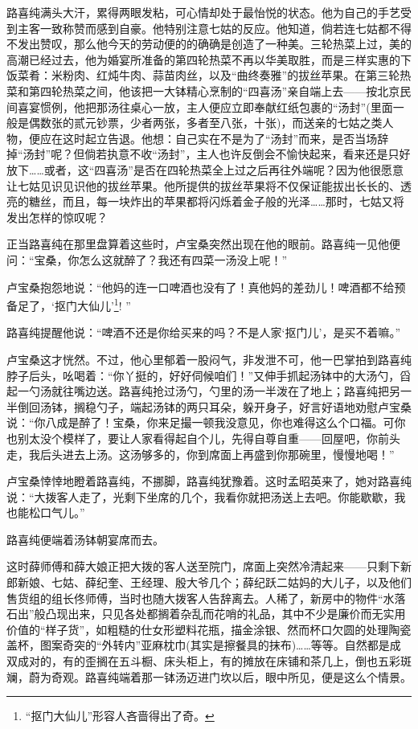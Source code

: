 \par 路喜纯满头大汗，累得两眼发粘，可心情却处于最怡悦的状态。他为自己的手艺受到主客一致称赞而感到自豪。他特别注意七姑的反应。他知道，倘若连七姑都不得不发出赞叹，那么他今天的劳动便的的确确是创造了一种美。三轮热菜上过，美的高潮已经过去，他为婚宴所准备的第四轮热菜不再以华美取胜，而是三样实惠的下饭菜肴：米粉肉、红炖牛肉、蒜苗肉丝，以及“曲终奏雅”的拔丝苹果。在第三轮热菜和第四轮热菜之间，他该把一大钵精心烹制的“四喜汤”亲自端上去——按北京民间喜宴惯例，他把那汤往桌心一放，主人便应立即奉献红纸包裹的“汤封”(里面一般是偶数张的贰元钞票，少者两张，多者至八张，十张)，而送亲的七姑之类人物，便应在这时起立告退。他想：自己实在不是为了“汤封”而来，是否当场辞掉“汤封”呢？但倘若执意不收“汤封”，主人也许反倒会不愉快起来，看来还是只好放下……或者，这“四喜汤”是否在四轮热菜全上过之后再往外端呢？因为他很愿意让七姑见识见识他的拔丝苹果。他所提供的拔丝苹果将不仅保证能拔出长长的、透亮的糖丝，而且，每一块炸出的苹果都将闪烁着金子般的光泽……那时，七姑又将发出怎样的惊叹呢？
\par 正当路喜纯在那里盘算着这些时，卢宝桑突然出现在他的眼前。路喜纯一见他便问：“宝桑，你怎么这就醉了？我还有四菜一汤没上呢！”
\par 卢宝桑抱怨地说：“他妈的连一口啤酒也没有了！真他妈的差劲儿！啤酒都不给预备足了，‘抠门大仙儿’\footnote{“抠门大仙儿”形容人吝啬得出了奇。}! ”
\par 路喜纯提醒他说：“啤酒不还是你给买来的吗？不是人家‘抠门儿’，是买不着嘛。”
\par 卢宝桑这才恍然。不过，他心里郁着一股闷气，非发泄不可，他一巴掌拍到路喜纯脖子后头，吆喝着：“你丫挺的，好好伺候咱们！”又伸手抓起汤钵中的大汤勺，舀起一勺汤就往嘴边送。路喜纯抢过汤勺，勺里的汤一半泼在了地上；路喜纯把另一半倒回汤钵，搁稳勺子，端起汤钵的两只耳朵，躲开身子，好言好语地劝慰卢宝桑说：“你八成是醉了！宝桑，你来足撮一顿我没意见，你也难得这么个口福。可你也别太没个模样了，要让人家看得起自个儿，先得自尊自重——回屋吧，你前头走，我后头进去上汤。这汤够多的，你到席面上再盛到你那碗里，慢慢地喝！”
\par 卢宝桑悻悻地瞪着路喜纯，不挪脚，路喜纯犹豫着。这时孟昭英来了，她对路喜纯说：“大拨客人走了，光剩下坐席的几个，我看你就把汤送上去吧。你能歇歇，我也能松口气儿。”
\par 路喜纯便端着汤钵朝宴席而去。
\par 这时薛师傅和薛大娘正把大拨的客人送至院门，席面上突然冷清起来——只剩下新郎新娘、七姑、薛纪奎、王经理、殷大爷几个；薛纪跃二姑妈的大儿子，以及他们售货组的组长佟师傅，当时也随大拨客人告辞离去。人稀了，新房中的物件“水落石出”般凸现出来，只见各处都搁着杂乱而花哨的礼品，其中不少是廉价而无实用价值的“样子货”，如粗糙的仕女形塑料花瓶，描金涂银、然而杯口欠圆的处理陶瓷盖杯，图案奇突的“外转内”亚麻枕巾(其实是擦餐具的抹布)……等等。自然都是成双成对的，有的歪搁在五斗橱、床头柜上，有的摊放在床铺和茶几上，倒也五彩斑斓，蔚为奇观。路喜纯端着那一钵汤迈进门坎以后，眼中所见，便是这么个情景。
